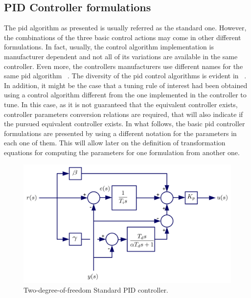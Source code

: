 \subsection{PID Controller formulations}
\label{sec:3.1}
The \gls{pid} algorithm as presented is usually referred as the standard one. However, the combinations of the three basic control actions may come in other different formulations. In fact, usually, the control algorithm implementation is manufacturer dependent and not all of its variations are available in the same controller. Even more, the controllers manufacturers use different names for the same \gls{pid} algorithm~\citep{gerry1987} \citep{vilanova2017WEE}.  The diversity of the \gls{pid} control algorithms is evident in~\citet{odwyer2006} .  In addition, it might be the case that a tuning rule of interest had been obtained using a control algorithm different from the one implemented in the controller to tune. In this case, as it is not guaranteed that the equivalent controller exists, controller parameters conversion relations are required, that will also indicate if the pursued equivalent controller exists. In what follows, the basic \gls{pid} controller formulations are presented by using a different notation for the parameters in each one of them. This will allow later on the definition of transformation equations for computing the parameters for one formulation from another one.
%
\begin{figure}[tb]
\centering
\includegraphics[width=\linewidth]{../figuras/Ch2PID_Schema} 
\caption{Two-degree-of-freedom Standard PID controller.} 
\label{Ch2fig:PID_Schema}
\end{figure}
%
